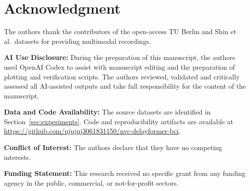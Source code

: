 \documentclass[journal]{IEEEtran}
\begin{document}
\section*{Acknowledgment}
The authors thank the contributors of the open-access TU Berlin and Shin et al.\ datasets for providing multimodal recordings.
\par\textbf{AI Use Disclosure:} During the preparation of this manuscript, the authors used OpenAI Codex to assist with manuscript editing and the preparation of plotting and verification scripts. The authors reviewed, validated and critically assessed all AI-assisted outputs and take full responsibility for the content of the manuscript.
\par\textbf{Data and Code Availability:} The source datasets are identified in Section~\ref{sec:experiments}. Code and reproducibility artifacts are available at \url{https://github.com/ujujuj3061831150/nvc-delayformer-bci}.
\par\textbf{Conflict of Interest:} The authors declare that they have no competing interests.
\par\textbf{Funding Statement:} This research received no specific grant from any funding agency in the public, commercial, or not-for-profit sectors.


\end{document}
